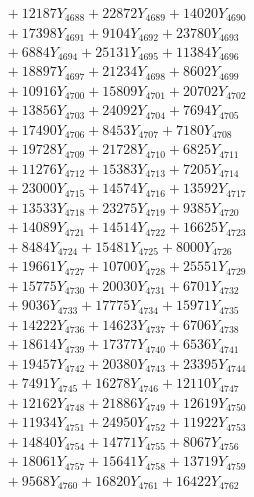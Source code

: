 \documentclass[a4paper,10pt]{article}
\begin{document}
{\begin{align}
&\;  + 12187 Y_{4688} + 22872 Y_{4689} + 14020 Y_{4690} \\[0.3ex]
&\;  + 17398 Y_{4691} + 9104 Y_{4692} + 23780 Y_{4693} \\[0.3ex]
&\;  + 6884 Y_{4694} + 25131 Y_{4695} + 11384 Y_{4696} \\[0.3ex]
&\;  + 18897 Y_{4697} + 21234 Y_{4698} + 8602 Y_{4699} \\[0.3ex]
&\;  + 10916 Y_{4700} + 15809 Y_{4701} + 20702 Y_{4702} \\[0.3ex]
&\;  + 13856 Y_{4703} + 24092 Y_{4704} + 7694 Y_{4705} \\[0.3ex]
&\;  + 17490 Y_{4706} + 8453 Y_{4707} + 7180 Y_{4708} \\[0.5ex]\allowbreak
&\;  + 19728 Y_{4709} + 21728 Y_{4710} + 6825 Y_{4711} \\[0.3ex]
&\;  + 11276 Y_{4712} + 15383 Y_{4713} + 7205 Y_{4714} \\[0.3ex]
&\;  + 23000 Y_{4715} + 14574 Y_{4716} + 13592 Y_{4717} \\[0.3ex]
&\;  + 13533 Y_{4718} + 23275 Y_{4719} + 9385 Y_{4720} \\[0.3ex]
&\;  + 14089 Y_{4721} + 14514 Y_{4722} + 16625 Y_{4723} \\[0.3ex]
&\;  + 8484 Y_{4724} + 15481 Y_{4725} + 8000 Y_{4726} \\[0.3ex]
&\;  + 19661 Y_{4727} + 10700 Y_{4728} + 25551 Y_{4729} \\[0.3ex]
&\;  + 15775 Y_{4730} + 20030 Y_{4731} + 6701 Y_{4732} \\[0.3ex]
&\;  + 9036 Y_{4733} + 17775 Y_{4734} + 15971 Y_{4735} \\[0.3ex]
&\;  + 14222 Y_{4736} + 14623 Y_{4737} + 6706 Y_{4738} \\[0.5ex]\allowbreak
&\;  + 18614 Y_{4739} + 17377 Y_{4740} + 6536 Y_{4741} \\[0.3ex]
&\;  + 19457 Y_{4742} + 20380 Y_{4743} + 23395 Y_{4744} \\[0.3ex]
&\;  + 7491 Y_{4745} + 16278 Y_{4746} + 12110 Y_{4747} \\[0.3ex]
&\;  + 12162 Y_{4748} + 21886 Y_{4749} + 12619 Y_{4750} \\[0.3ex]
&\;  + 11934 Y_{4751} + 24950 Y_{4752} + 11922 Y_{4753} \\[0.3ex]
&\;  + 14840 Y_{4754} + 14771 Y_{4755} + 8067 Y_{4756} \\[0.3ex]
&\;  + 18061 Y_{4757} + 15641 Y_{4758} + 13719 Y_{4759} \\[0.3ex]
&\;  + 9568 Y_{4760} + 16820 Y_{4761} + 16422 Y_{4762} \\[0.3ex]

\end{align}}
\end{document}
